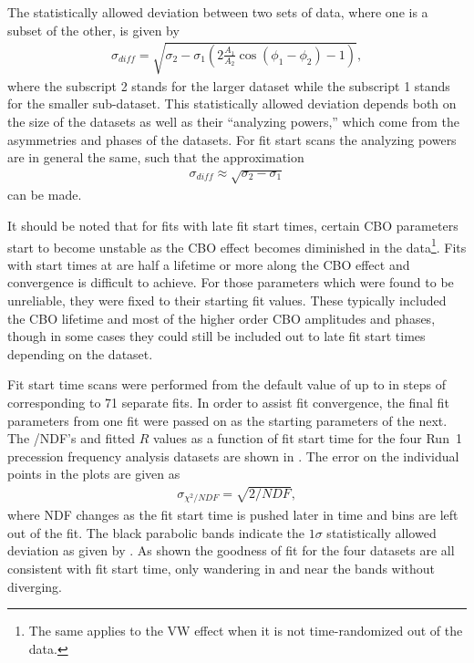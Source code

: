 The statistically allowed deviation between two sets of \gmtwo data, where one is a subset of the other, is given by \cite{E821FinalReport}
  \begin{align} \label{eq:sigmaDiffFull}
    \sigma_{diff} = \sqrt{\sigma_{2} - \sigma_{1}(2 \frac{A_{1}}{A_{2}}\cos(\phi_{1}-\phi_{2}) - 1)},
  \end{align}
where the subscript 2 stands for the larger dataset while the subscript 1 stands for the smaller sub-dataset. This statistically allowed deviation depends both on the size of the datasets as well as their ``analyzing powers,'' which come from the asymmetries and phases of the datasets. For fit start scans the analyzing powers are in general the same, such that the approximation 
  \begin{align} \label{eq:sigmaDiffApprox}
    \sigma_{diff} \approx \sqrt{\sigma_{2} - \sigma_{1}}
  \end{align}
can be made. 


It should be noted that for fits with late fit start times, certain CBO parameters start to become unstable as the CBO effect becomes diminished in the data\footnote{The same applies to the VW effect when it is not time-randomized out of the data.}. Fits with start times at  are half a lifetime or more along the CBO effect and convergence is difficult to achieve. For those parameters which were found to be unreliable, they were fixed to their starting fit values. These typically included the CBO lifetime and most of the higher order CBO amplitudes and phases, though in some cases they could still be included out to late fit start times depending on the dataset.


Fit start time scans were performed from the default value of  up to  in steps of  corresponding to 71 separate fits. In order to assist fit convergence, the final fit parameters from one fit were passed on as the starting parameters of the next. The \chisq/NDF's and fitted $R$ values as a function of fit start time for the four Run~1 precession frequency analysis datasets are shown in . The error on the individual points in the \chisq plots are given as 
  \begin{align}
    \sigma_{\chi^{2}/NDF} = \sqrt{2/NDF},
  \end{align}
where NDF changes as the fit start time is pushed later in time and bins are left out of the fit. The black parabolic bands indicate the $1\sigma$ statistically allowed deviation as given by . As shown the goodness of fit for the four datasets are all consistent with fit start time, only wandering in and near the bands without diverging.


